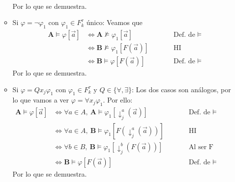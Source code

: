 \documentclass{article}
\begin{document}
\begin{itemize}
\begin{itemize}
\begin{equation*}
\begin{alignedat}{2}
                  \end{alignedat}
                \end{equation*}
                Por lo que se demuestra.
          \item Si $\varphi=\neg\varphi_1$ con $\varphi_1\in F^\tau_k$ único: Veamos que
                \begin{equation*}
                  \begin{alignedat}{2}
                    \mathbf{A}\vDash\varphi[\vec{a}] & \iff\mathbf{A}\nvDash\varphi_1[\vec{a}]    &  & \qquad\text{Def. de }\vDash \\
                                                     & \iff\mathbf{B}\nvDash\varphi_1[F(\vec{a})] &  & \qquad\text{HI}             \\
                                                     & \iff\mathbf{B}\vDash\varphi[F(\vec{a})]    &  & \qquad\text{Def. de }\vDash
                  \end{alignedat}
                \end{equation*}
                Por lo que se demuestra.
          \item Si $\varphi=Qx_j\varphi_1$ con $\varphi_1\in F^\tau_k$ y $Q\in\{\forall,\exists\}$: Los dos casos son análogos, por lo que vamos a ver $\varphi=\forall x_j\varphi_1$. Por ello:
                \begin{equation*}
                  \begin{alignedat}{2}
                    \mathbf{A}\vDash\varphi[\vec{a}] & \iff\forall a\in A,\ \mathbf{A}\vDash\varphi_1[\downarrow^a_j(\vec{a})]    &  & \qquad\text{Def. de }\vDash                         \\
                                                     & \iff\forall a\in A,\ \mathbf{B}\vDash\varphi_1[F(\downarrow^a_j(\vec{a}))] &  & \qquad\text{HI}                                     \\
                                                     & \iff\forall b\in B,\ \mathbf{B}\vDash\varphi_1[\downarrow^b_j(F(\vec{a}))] &  & \qquad\text{Al ser F isomorfismo (i.e., biyectivo)} \\
                                                     & \iff\mathbf{B}\vDash\varphi[F(\vec{a})]                                    &  & \qquad\text{Def. de }\vDash
                  \end{alignedat}
                \end{equation*}
                Por lo que se demuestra.
        \end{itemize}
\end{itemize}
\end{document}
